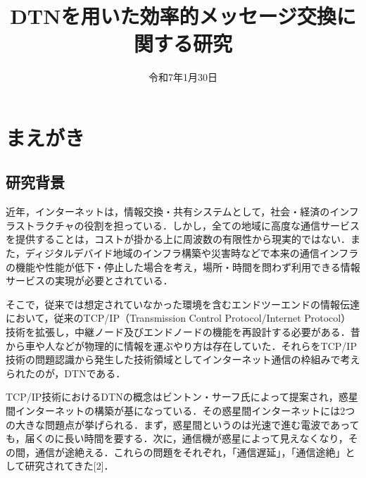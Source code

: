 \documentclass[11pt]{icsthesis}
\title{DTNを用いた効率的メッセージ交換に関する研究}
\date{令和7年1月30日}
\begin{document}
\maketitle
\pagestyle{fancy}
\fancyhead[R]{\nouppercase{\fontsize{10.5pt}{0pt}\selectfont\rightmark}}
\fancyhead[L]{\nouppercase{\fontsize{10.5pt}{0pt}\selectfont\leftmark}}
\fancyfoot[C]{--\ \thepage\ --}
\renewcommand{\headrulewidth}{0.3truemm}
\setcounter{tocdepth}{4}
\pagestyle{fancy}
\fancyfoot[C]{--\ \thepage\ --}
{\makeatletter
\let\ps@jpl@in\ps@empty
\makeatother
\pagestyle{plain}
\tableofcontents
\clearpage}

\chapter{まえがき}
\section{研究背景}
近年，インターネットは，情報交換・共有システムとして，社会・経済のインフラストラクチャの役割を担っている．しかし，全ての地域に高度な通信サービスを提供することは，コストが掛かる上に周波数の有限性から現実的ではない．また，ディジタルデバイド地域のインフラ構築や災害時などで本来の通信インフラの機能や性能が低下・停止した場合を考え，場所・時間を問わず利用できる情報サービスの実現が必要とされている．

そこで，従来では想定されていなかった環境を含むエンドツーエンドの情報伝達において，従来のTCP/IP（Transmission Control Protocol/Internet Protocol）技術を拡張し，中継ノード及びエンドノードの機能を再設計する必要がある．昔から車や人などが物理的に情報を運ぶやり方は存在していた．それらをTCP/IP技術の問題認識から発生した技術領域としてインターネット通信の枠組みで考えられたのが，DTNである．

TCP/IP技術におけるDTNの概念はビントン・サーフ氏によって提案され，惑星間インターネットの構築が基になっている．その惑星間インターネットには2つの大きな問題点が挙げられる．まず，惑星間というのは光速で進む電波であっても，届くのに長い時間を要する．次に，通信機が惑星によって見えなくなり，その間，通信が途絶える．これらの問題をそれぞれ，「通信遅延」，「通信途絶」として研究されてきた[2]．
\end{document}
